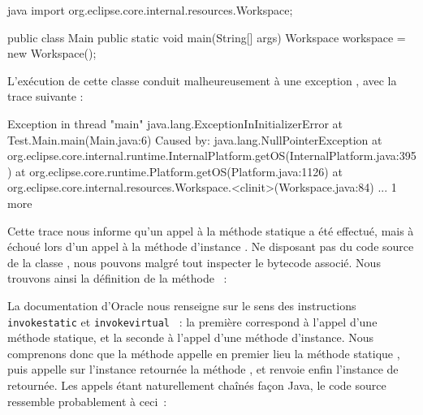 \begin{imtaCode}{java}
import org.eclipse.core.internal.resources.Workspace;    

public class Main {
    public static void main(String[] args) {
        Workspace workspace = new Workspace();
    }
}
\end{imtaCode}

L'exécution de cette classe conduit malheureusement à une exception , avec la trace suivante :

\begin{imtaConsole}
Exception in thread "main" java.lang.ExceptionInInitializerError
	at Test.Main.main(Main.java:6)
Caused by: java.lang.NullPointerException
	at org.eclipse.core.internal.runtime.InternalPlatform.getOS(InternalPlatform.java:395)
	at org.eclipse.core.runtime.Platform.getOS(Platform.java:1126)
	at org.eclipse.core.internal.resources.Workspace.<clinit>(Workspace.java:84)
	... 1 more
\end{imtaConsole}

Cette trace nous informe qu'un appel à la méthode statique  a été effectué, mais à échoué lors d'un appel à la méthode d'instance %
.
Ne disposant pas du code source de la classe , nous pouvons malgré tout inspecter le bytecode associé.
Nous trouvons ainsi la définition de la méthode ~:


La documentation d'Oracle nous renseigne sur le sens des instructions \texttt{invokestatic} \cite{javainvokestatic} et \texttt{invokevirtual} \cite{javainvokevirtual}~: %
la première correspond à l'appel d'une méthode statique, et la seconde à l'appel d'une méthode d'instance.
Nous comprenons donc que la méthode  appelle en premier lieu la méthode statique , %
puis appelle sur l'instance retournée la méthode , et renvoie enfin l'instance de  retournée.
Les appels étant naturellement chaînés façon Java, le code source ressemble probablement à ceci~:

